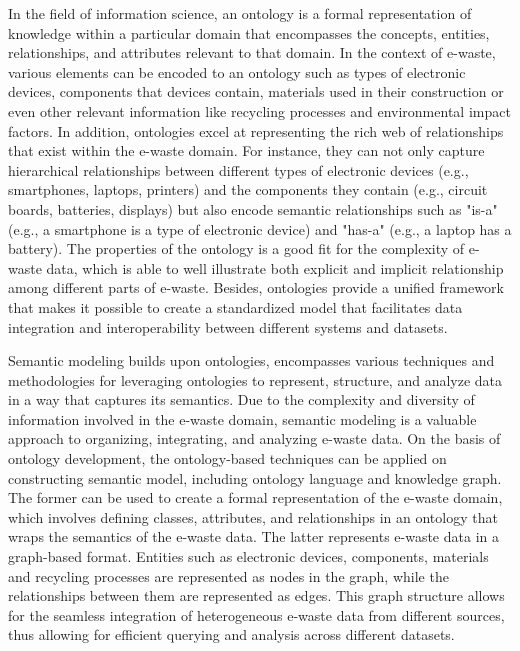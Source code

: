 \documentclass{article}
\numberwithin{equation}{section}
\begin{document}
In the field of information science, an ontology is a formal representation of knowledge within a particular domain that encompasses the concepts, entities, relationships, and attributes relevant to that domain\cite{sat20}. In the context of e-waste, various elements can be encoded to an ontology such as types of electronic devices, components that devices contain, materials used in their construction or even other relevant information like recycling processes and environmental impact factors\cite{rama15}. In addition, ontologies excel at representing the rich web of relationships that exist within the e-waste domain. For instance, they can not only capture hierarchical relationships between different types of electronic devices (e.g., smartphones, laptops, printers) and the components they contain (e.g., circuit boards, batteries, displays) but also encode semantic relationships such as "is-a" (e.g., a smartphone is a type of electronic device) and "has-a" (e.g., a laptop has a battery). The properties of the ontology is a good fit for the complexity of e-waste data, which is able to well illustrate both explicit and implicit relationship among different parts of e-waste. Besides, ontologies provide a unified framework that makes it possible to create a standardized model that facilitates data integration and interoperability between different systems and datasets\cite{dara16}.

Semantic modeling builds upon ontologies, encompasses various techniques and methodologies for leveraging ontologies to represent, structure, and analyze data in a way that captures its semantics\cite{band19}. Due to the complexity and diversity of information involved in the e-waste domain, semantic modeling is a valuable approach to organizing, integrating, and analyzing e-waste data. On the basis of ontology development, the ontology-based techniques can be applied on constructing semantic model, including ontology language and knowledge graph\cite{gon17}. The former can be used to create a formal representation of the e-waste domain, which involves defining classes, attributes, and relationships in an ontology that wraps the semantics of the e-waste data. The latter represents e-waste data in a graph-based format. Entities such as electronic devices, components, materials and recycling processes are represented as nodes in the graph, while the relationships between them are represented as edges. This graph structure allows for the seamless integration of heterogeneous e-waste data from different sources\cite{ange22}, thus allowing for efficient querying and analysis across different datasets. 
\end{document}
